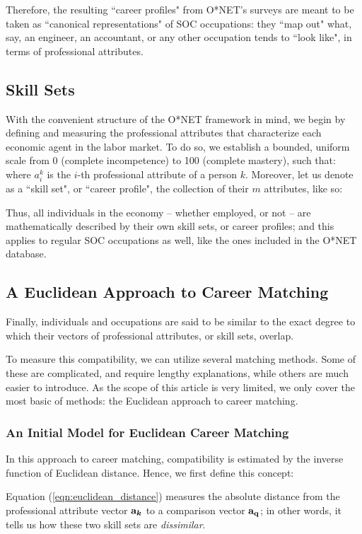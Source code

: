 \documentclass{article}
\begin{document}
Therefore, the resulting ``career profiles" from O*NET's surveys are meant to
be taken as ``canonical representations" of SOC occupations: they ``map out"
what, say, an engineer, an accountant, or any other occupation tends to ``look
like", in terms of professional attributes.

\subsection{Skill Sets}
With the convenient structure of the O*NET framework in mind, we begin by
defining and measuring the professional attributes that characterize each
economic agent in the labor market. To do so, we establish a bounded, uniform
scale from 0 (complete incompetence) to 100 (complete mastery), such that:
\EqnAttribute where $a_{i}^{k}$ is the $i$-th professional attribute of a
person $k$. Moreover, let us denote as a ``skill set", or ``career profile",
the collection of their $m$ attributes, like so: \EqnSkillSet

Thus, all individuals in the economy -- whether employed, or not -- are
mathematically described by their own skill sets, or career profiles; and this
applies to regular SOC occupations as well, like the ones included in the O*NET
database.

\subsection{A Euclidean Approach to Career Matching}
Finally, individuals and occupations are said to be similar to the exact degree
to which their vectors of professional attributes, or skill sets, overlap.

To measure this compatibility, we can utilize several matching methods. Some of
these are complicated, and require lengthy explanations, while others are much
easier to introduce. As the scope of this article is very limited, we only
cover the most basic of methods: the Euclidean approach to career matching.

\subsubsection{An Initial Model for Euclidean Career Matching}
In this approach to career matching, compatibility is estimated by the inverse
function of Euclidean distance. Hence, we first define this concept:
\EqnEuclideanDistance

Equation (\ref{eqn:euclidean_distance}) measures the absolute distance from the
professional attribute vector $\vb{a_{\boldsymbol{k}}}$ to a comparison vector
$\vb{a_{q}}$; in other words, it tells us how these two skill sets are
\textit{dissimilar}.
\end{document}
